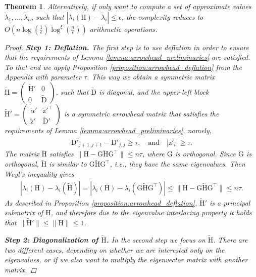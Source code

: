 \documentclass{article}
\newcommand{\lpar}{\left(}
\newcommand{\rpar}{\right)}
\newtheorem{theorem}{Theorem}[section]
\newcommand\vecztilde{\widetilde{\boldsymbol{\mathrm{z}}}}
\newcommand\matG{\boldsymbol{\mathrm{G}}}
\newcommand\matH{\boldsymbol{\mathrm{H}}}
\newcommand\matDtilde{\widetilde{\boldsymbol{\mathrm{D}}}}
\newcommand\matHtilde{\widetilde{\boldsymbol{\mathrm{H}}}}
\newcommand{\cfmm}{\xi}
\begin{document}
\begin{theorem}
    Alternatively, if only want to compute a set of approximate values $\widetilde\lambda_1,\ldots,\widetilde\lambda_n$, such that $|\lambda_i(\matH)-\widetilde\lambda_i|\leq \epsilon$, the complexity reduces to $O\lpar n\log(\frac{1}{\epsilon})\log^{\cfmm}(\frac{n}{\epsilon})\rpar$ arithmetic operations.
    \begin{proof}
        \textbf{Step 1: Deflation.} The first step is to use deflation in order to ensure that the requirements of Lemma \ref{lemma:arrowhead_preliminaries} are satisfied. To that end we apply Proposition \ref{proposition:arrowhead_deflation} from the Appendix with parameter $\tau$. This way we obtain a symmetric  matrix $\matHtilde=\begin{pmatrix}
            \matHtilde' & 0\\
            0 & \matDtilde
        \end{pmatrix}$, such that $\matDtilde$ is diagonal, and the upper-left block $\matHtilde'=\begin{pmatrix}
            \widetilde\alpha' & \vecztilde'^\top \\
            \vecztilde' & \matDtilde'
        \end{pmatrix}$ is a symmetric arrowhead matrix that satisfies the requirements of Lemma \ref{lemma:arrowhead_preliminaries}, namely,
        \begin{align}
            \matDtilde'_{j+1,j+1}-\matDtilde'_{j,j} \geq \tau, \quad \text{and} \quad |\vecztilde'_i|\geq \tau.
        \end{align}
        The matrix $\matHtilde$ satisfies $\|\matH-\matG\matHtilde\matG^\top\|\leq n\tau$, where $\matG$ is orthogonal. 
        Since $\matG$ is orthogonal, $\matHtilde$ is similar to $\matG\matHtilde\matG^\top$, i.e., they have the same eigenvalues. Then Weyl's inequality gives 
        \begin{align*}
            |\lambda_i(\matH)-\lambda_i(\matHtilde)|
            =
            |\lambda_i(\matH)-\lambda_i(\matG\matHtilde\matG^\top)|
            \leq 
            \|\matH-\matG\matHtilde\matG^\top\|
            \leq
            n\tau.
        \end{align*}
        As described in Proposition \ref{proposition:arrowhead_deflation}, $\matHtilde'$ is a principal submatrix of $\matH$, and therefore due to the eigenvalue interlacing property it holds that $\|\matHtilde'\|\leq \|\matH\|\leq 1$.
        
        \textbf{Step 2: Diagonalization of $\matHtilde$.} 
        In the second step we focus on $\matHtilde$. There are two different cases, depending on whether we are interested only on the eigenvalues, or if we also want to multiply the eigenvector matrix with another matrix.
        

\end{proof}
\end{theorem}
\end{document}
